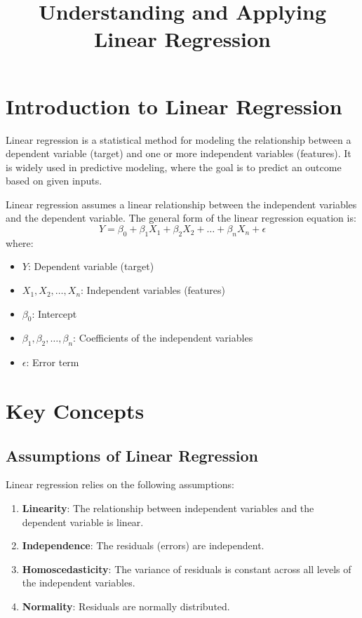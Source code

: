 \documentclass[a4paper,12pt]{article}
\begin{document}
\title{Understanding and Applying Linear Regression}
\author{}
\date{}
\maketitle

\tableofcontents

\newpage

\section{Introduction to Linear Regression}
Linear regression is a statistical method for modeling the relationship between a dependent variable (target) and one or more independent variables (features). It is widely used in predictive modeling, where the goal is to predict an outcome based on given inputs.

Linear regression assumes a linear relationship between the independent variables and the dependent variable. The general form of the linear regression equation is:
\[
Y = \beta_0 + \beta_1 X_1 + \beta_2 X_2 + \ldots + \beta_n X_n + \epsilon
\]
where:
\begin{itemize}
    \item $Y$: Dependent variable (target)
    \item $X_1, X_2, \ldots, X_n$: Independent variables (features)
    \item $\beta_0$: Intercept
    \item $\beta_1, \beta_2, \ldots, \beta_n$: Coefficients of the independent variables
    \item $\epsilon$: Error term
\end{itemize}

\section{Key Concepts}

\subsection{Assumptions of Linear Regression}
Linear regression relies on the following assumptions:
\begin{enumerate}
    \item \textbf{Linearity}: The relationship between independent variables and the dependent variable is linear.
    \item \textbf{Independence}: The residuals (errors) are independent.
    \item \textbf{Homoscedasticity}: The variance of residuals is constant across all levels of the independent variables.
    \item \textbf{Normality}: Residuals are normally distributed.
\end{enumerate}
\end{document}
